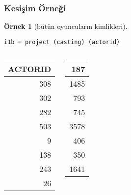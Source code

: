 \documentclass[dvipsnames]{beamer}
\theoremstyle{definition}
\theoremstyle{example}
\newtheorem{ornek}[theorem]{Örnek}
\theoremstyle{plain}
\begin{document}
\begin{frame}[fragile]
  \frametitle{Kesişim Örneği}

  \begin{ornek}[bütün oyuncuların kimlikleri]
    \begin{lstlisting}
i1b = project (casting) (actorid)
    \end{lstlisting}

    \pause
    \begin{columns}[b]
      \begin{tiny}
      \begin{table}
        \begin{tabular}{|r|}\hline
ACTORID\\\hline\hline
    308\\\hline
    302\\\hline
    282\\\hline
    503\\\hline
      9\\\hline
    138\\\hline
    243\\\hline
     26\\\hline
        \end{tabular}
      \end{table}
      \end{tiny}

      \begin{tiny}
      \begin{table}
        \begin{tabular}{|r|}\hline
    187\\\hline
   1485\\\hline
    793\\\hline
    745\\\hline
   3578\\\hline
    406\\\hline
    350\\\hline
   1641\\\hline
        \end{tabular}
      \end{table}
      \end{tiny}
    \end{columns}
  \end{ornek}
\end{frame}
\end{document}
